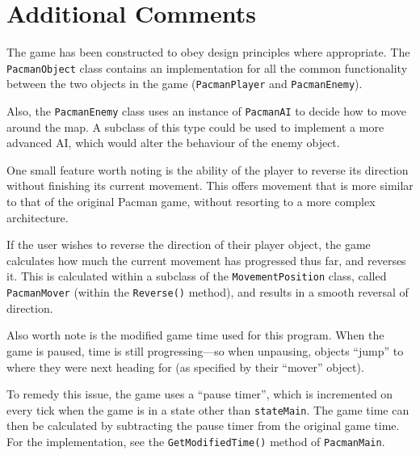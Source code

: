 \documentclass[a4paper,11pt]{article}
\begin{document}
    \section{Additional Comments}

    The game has been constructed to obey design principles where appropriate.
    The \verb!PacmanObject! class contains an implementation for all the common
    functionality between the two objects in the game (\verb!PacmanPlayer! and
    \verb!PacmanEnemy!).
    
    Also, the \verb!PacmanEnemy! class uses an instance of \verb!PacmanAI! to
    decide how to move around the map. A subclass of this type could be used to
    implement a more advanced AI, which would alter the behaviour of the enemy
    object.

    One small feature worth noting is the ability of the player to reverse its
    direction without finishing its current movement.  This offers movement
    that is more similar to that of the original Pacman game, without resorting
    to a more complex architecture.

    If the user wishes to reverse the direction of their player object, the
    game calculates how much the current movement has progressed thus far, and
    reverses it. This is calculated within a subclass of the
    \verb!MovementPosition! class, called \verb!PacmanMover! (within the
    \verb!Reverse()! method), and results in a smooth reversal of direction.

    Also worth note is the modified game time used for this program. When the
    game is paused, time is still progressing---so when unpausing, objects
    ``jump'' to where they were next heading for (as specified by their
    ``mover'' object).
    
    To remedy this issue, the game uses a ``pause timer'', which is incremented
    on every tick when the game is in a state other than \verb!stateMain!. The
    game time can then be calculated by subtracting the pause timer from the
    original game time. For the implementation, see the
    \verb!GetModifiedTime()! method of \verb!PacmanMain!.
\end{document}
